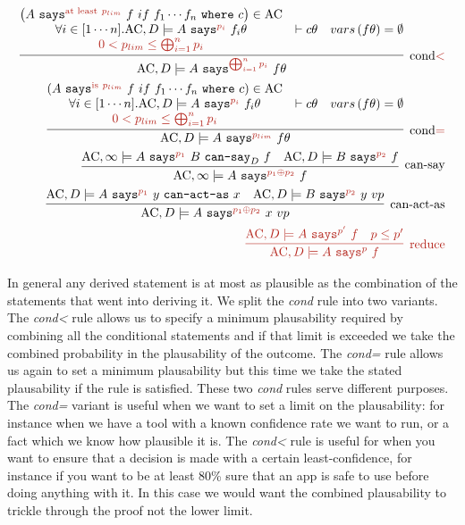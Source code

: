 \documentclass[a4paper]{article}
\newcommand{\new}[1]{{\color{BrickRed} #1}}
\newcommand{\ac}[0]{\ensuremath\text{AC}}
\newcommand{\secpalmath}[1]{\ensuremath\texttt{#1}}
\newcommand{\says}[1]{\secpalmath{says}^{\new{#1}}}
\newcommand{\canSay}[1]{\secpalmath{can-say}_{#1}}
\newcommand{\canActAs}[0]{\secpalmath{can-act-as}}
\newcommand{\where}[0]{\secpalmath{where}}
\begin{document}
\begin{eqnarray}
  \infer[\text{cond\new{<}}]{
    \ac, D \models A~\says{\bigoplus_{i=1}^n p_i}~f\theta
  }{
    \begin{matrix}{
      \left(A~\says{\text{at least}~p_{lim}}~f~if~f_1\cdots f_n~\where~c\right) \in \ac
    }\\{
      \forall i \in [1\cdots n]. \ac, D \models A~\says{p_i}~f_i\theta
    }\\\new{
      0 < p_{lim} \leq \bigoplus_{i=1}^n p_i
    }
    \end{matrix}&
    \vdash c\theta &
    vars\left(f\theta\right) = \emptyset
  }
  \\
  \infer[\text{cond\new{=}}]{
    \ac, D \models A~\says{p_{lim}}~f\theta
  }{
    \begin{matrix}{
      \left(A~\says{\text{is}~p_{lim}}~f~if~f_1\cdots f_n~\where~c\right) \in \ac
    }\\{
      \forall i \in [1\cdots n]. \ac, D \models A~\says{p_i}~f_i\theta
    }\\\new{
      0 < p_{lim} \leq \bigoplus_{i=1}^n p_i
    }
    \end{matrix}&
    \vdash c\theta &
    vars\left(f\theta\right) = \emptyset
  }
  \\
  \infer[\text{can-say}]{
    \ac, \infty \models A~\says{p_1 \oplus p_2}~f
  }{
    \ac, \infty \models A~\says{p_1}~B~\canSay{D}~f &
    \ac, D \models B~\says{p_2}~f
  }
  \\
  \infer[\text{can-act-as}]{
    \ac, D \models A~\says{p_1 \oplus p_2}~x~vp
  }{
    \ac, D \models A~\says{p_1}~y~\canActAs~x &
    \ac, D \models B~\says{p_2}~y~vp
  }
  \\
  \new{
    \infer[\text{reduce}]{
        \ac, D \models A~\says{p}~f
    }{
        \ac, D \models A~\says{p^\prime}~f & p \leq p^\prime
    }
  }
\end{eqnarray}

In general any derived statement is at most as plausible as the combination of the statements that went into deriving it.  We split the \emph{cond} rule into two variants.  The \emph{cond<} rule allows us to specify a minimum plausability required by combining all the conditional statements and if that limit is exceeded we take the combined probability in the plausability of the outcome.
The \emph{cond=} rule allows us again to set a minimum plausability but this time we take the stated plausability if the rule is satisfied.  These two \emph{cond} rules serve different purposes.  The \emph{cond=} variant is useful when we want to set a limit on the plausability: for instance when we have a tool with a known confidence rate we want to run, or a fact which we know how plausible it is.  The \emph{cond<} rule is useful for when you want to ensure that a decision is made with a certain least-confidence, for instance if you want to be at least 80\% sure that an app is safe to use before doing anything with it.  In this case we would want the combined plausability to trickle through the proof not the lower limit.
\end{document}
